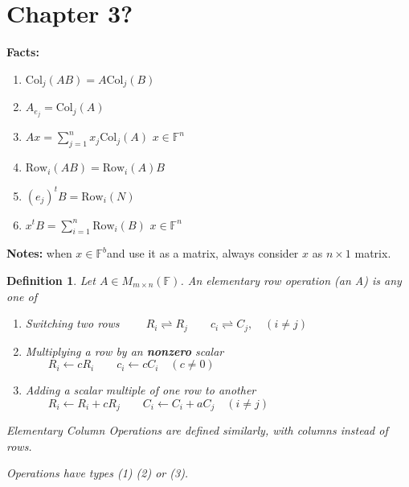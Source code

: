 \documentclass[12pt]{article}
\theoremstyle{plain}
\newtheorem{definition}{Definition}[subsection]
\newcommand{\Col}{\mathrm{Col}}
\newcommand{\Row}{\mathrm{Row}}
\newcommand{\mF}{{\mathbb{F}}}
\begin{document}
\newpage
\section{Chapter 3?}

	\textbf{Facts: } 
	\begin{enumerate}
		\item $\Col_j(AB) = A \Col_j(B)$
		\item $A_{e_j} = \Col_j(A)$
		\item $Ax = \sum_{j=1}^n x_j\Col_j(A)$ $x \in \mF^n$
		\item $\Row_i(AB) = \Row_i(A)B$
		\item $(e_j)^t B = \Row_i(N)$
		\item $x^t B = \sum_{i=1}^n \Row_i(B)$ $x \in \mF^n$
	\end{enumerate}
	\textbf{Notes: }when $x \in \mF^b $and use it as a matrix, always consider
	$x$ as $n \times 1$ matrix.\\

	\begin{definition}
		Let $A \in M_{m\times n}(\mF)$. An elementary row operation
		(an A) is any one of 
		\begin{enumerate}
			\item Switching two rows   
				$\qquad R_i \rightleftharpoons R_j 
				\qquad c_i \rightleftharpoons C_j, \quad (i\neq j)$
			\item Multiplying a row by an \textbf{nonzero} scalar
				$\qquad R_i \leftarrow c R_i \qquad c_i \leftarrow cC_i 
				\quad (c\neq 0)$
			\item Adding a scalar multiple of one row to another
				$\qquad R_i \leftarrow R_i + cR_j
				\qquad C_i \leftarrow C_i + aC_j \quad (i\neq j)$
		\end{enumerate}
		Elementary Column Operations are defined similarly, with columns
		instead of rows. 

		Operations have types (1) (2) or (3). \\
	\end{definition}
	
\end{document}
